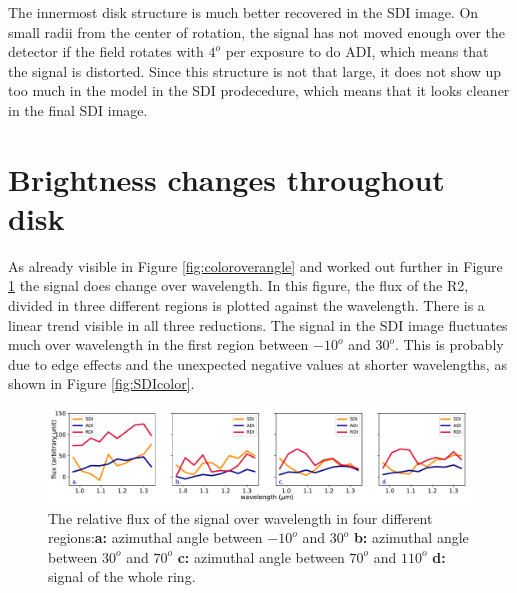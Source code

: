\documentclass[twoside,single]{lion-msc}
\begin{document}
The innermost disk structure is much better recovered in the SDI image. On small radii from the center of rotation, the signal has not moved enough over the detector if the field rotates with $4^o$ per exposure to do ADI, which means that the signal is distorted. Since this structure is not that large, it does not show up too much in the model in the SDI prodecedure, which means that it looks cleaner in the final SDI image.
\bigskip

\section{Brightness changes throughout disk}
As already visible in Figure \ref{fig:coloroverangle} and worked out further in Figure \ref{fig:coloroverpos} the signal does change over wavelength. In this figure, the flux of the R2, divided in three different regions is plotted against the wavelength. There is a linear trend visible in all three reductions. The signal in the SDI image fluctuates much over wavelength in the first region between $-10^o$ and $30^o$. This is probably due to edge effects and the unexpected negative values at shorter wavelengths, as shown in Figure \ref{fig:SDIcolor}. 

\begin{figure}[htb]
\centering
\includegraphics[trim={0cm 0cm 0cm 0cm},clip,width = \textwidth]{coloroverpos_rdi}
\caption{The relative flux of the signal over wavelength in four different regions:\textbf{a:} azimuthal angle between $-10^o$ and $30^o$  \textbf{b:} azimuthal angle between $30^o$ and $70^o$ \textbf{c:} azimuthal angle between $70^o$ and $110^o$ \textbf{d:} signal of the whole ring.}
\label{fig:coloroverpos}
\end{figure}
\end{document}
